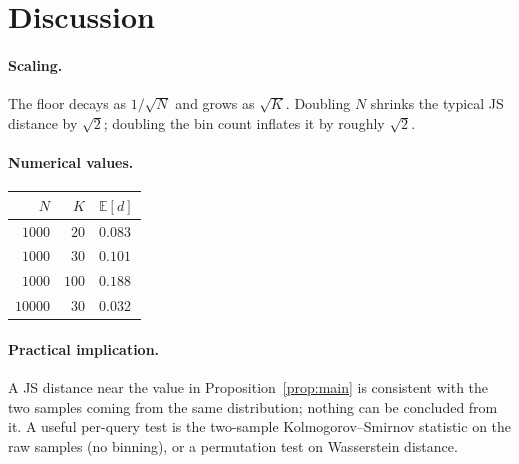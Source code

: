 \documentclass[11pt]{article}
\begin{document}
\section{Discussion}

\paragraph{Scaling.}
The floor decays as $1/\sqrt{N}$ and grows as $\sqrt{K}$. Doubling $N$
shrinks the typical JS distance by $\sqrt{2}$; doubling the bin count
inflates it by roughly $\sqrt{2}$.

\paragraph{Numerical values.}
\begin{center}
\begin{tabular}{rrl}
\toprule
$N$ & $K$ & $\mathbb{E}[d]$ \\
\midrule
$1000$  & $20$  & $0.083$ \\
$1000$  & $30$  & $0.101$ \\
$1000$  & $100$ & $0.188$ \\
$10000$ & $30$  & $0.032$ \\
\bottomrule
\end{tabular}
\end{center}

\paragraph{Practical implication.}
A JS distance near the value in Proposition~\ref{prop:main} is
consistent with the two samples coming from the same distribution;
nothing can be concluded from it.  A useful per-query test is the
two-sample Kolmogorov--Smirnov statistic on the raw samples (no
binning), or a permutation test on Wasserstein distance.
\end{document}
